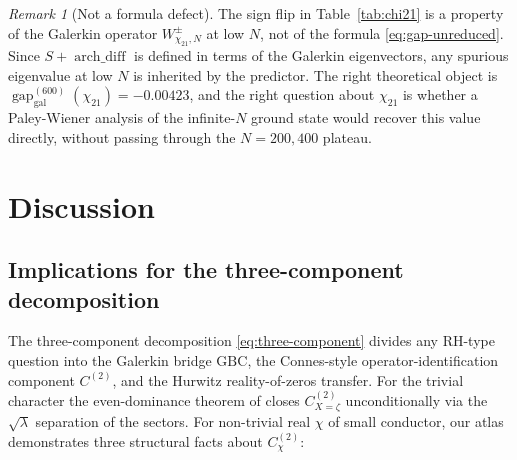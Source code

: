 \documentclass[10pt,twocolumn]{article}
\theoremstyle{definition}
\theoremstyle{remark}
\newtheorem{remark}[theorem]{Remark}
\newcommand{\gap}{\operatorname{gap}}
\newcommand{\chifn}{\chi}
\newcommand{\archdiff}{\operatorname{arch\_diff}}
\begin{document}
\begin{remark}[Not a formula defect]
\label{rem:chi21-not-defect}
The sign flip in Table~\ref{tab:chi21} is a property of the
Galerkin operator $W^\pm_{\chifn_{21},N}$ at low $N$, not of the
formula \eqref{eq:gap-unreduced}. Since $S+\archdiff$ is defined
in terms of the Galerkin eigenvectors, any spurious eigenvalue at
low $N$ is inherited by the predictor. The right theoretical
object is $\gap_{\mathrm{gal}}^{(600)}(\chifn_{21})=-0.00423$,
and the right question about $\chifn_{21}$ is whether a
Paley-Wiener analysis of the infinite-$N$ ground state would recover
this value directly, without passing through the $N=200,400$
plateau.
\end{remark}

\section{Discussion}
\label{sec:discussion}

\subsection{Implications for the three-component decomposition}
\label{sec:discussion-three-component}

The three-component decomposition \eqref{eq:three-component} divides
any RH-type question into the Galerkin bridge $\mathrm{GBC}$, the
Connes-style operator-identification component $C^{(2)}$, and the
Hurwitz reality-of-zeros transfer. For the trivial character the
even-dominance theorem of \cite{RH_II} closes $C^{(2)}_{X=\zeta}$
unconditionally via the $\sqrt{\lambda}$ separation of the sectors.
For non-trivial real $\chifn$ of small conductor, our atlas demonstrates
three structural facts about $C^{(2)}_{\chifn}$:
\end{document}
